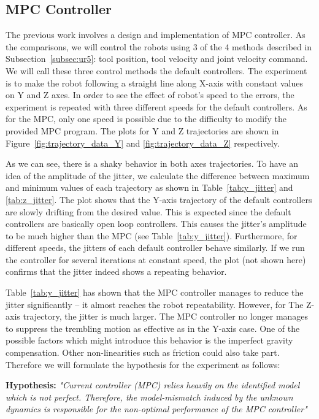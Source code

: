 \newpage
\subsection{\acs{MPC} Controller}
The previous work involves a design and implementation of \acs {MPC} controller. As the comparisons, we will control the robots using 3 of the 4 methods described in Subsection~\ref{subsec:ur5}: tool position, tool velocity and joint velocity command. We will call these three control methods the default controllers. The experiment is to make the robot following a straight line along X-axis with constant values on Y and Z axes.  In order to see the effect of robot's speed to the errors, the experiment is repeated with three different speeds for the default controllers. As for the \acs {MPC}, only one speed is possible due to the difficulty to modify the provided \acs {MPC} program. The plots for Y and Z trajectories are shown in Figure~\ref{fig:trajectory_data_Y} and \ref{fig:trajectory_data_Z} respectively. 

As we can see, there is a shaky behavior in both axes trajectories. To have an idea of the amplitude of the jitter, we calculate the difference between maximum and minimum values of each trajectory as shown in Table~\ref{tab:y_jitter} and \ref{tab:z_jitter}. The plot shows that the Y-axis trajectory of the default controllers are slowly drifting from the desired value. This is expected since the default controllers are basically open loop controllers. This causes the jitter's amplitude to be much higher than the \acs {MPC} (see Table~\ref{tab:y_jitter}). Furthermore, for different speeds, the jitters of each default controller behave similarly. If we run the controller for several iterations at constant speed, the plot (not shown here) confirms that the jitter indeed shows a repeating behavior. 

Table~\ref{tab:y_jitter} has shown that the \acs {MPC} controller manages to reduce the jitter significantly -- it almost reaches the robot repeatability. However, for The Z-axis trajectory, the jitter is much larger. The \acs {MPC} controller no longer manages to suppress the trembling motion as effective as in the Y-axis case. One of the possible factors which might introduce this behavior is the imperfect gravity compensation. Other non-linearities such as friction could also take part. Therefore we will formulate the hypothesis for the experiment as follows:

\textbf{Hypothesis:} \textit{"Current controller (\acs {MPC}) relies heavily on the identified model which is not perfect. Therefore, the model-mismatch induced by the unknown dynamics is responsible for the non-optimal performance of the \acs {MPC} controller" }

